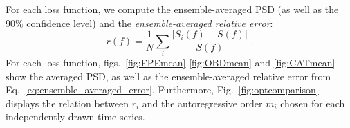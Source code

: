 \documentclass[twocolumn,showpacs,preprintnumbers,nofootinbib,prd,
superscriptaddress,10pt]{revtex4-1}
\begin{document}
For each loss function, we compute the ensemble-averaged PSD (as well as the $90\%$ confidence level) and the \textit{ensemble-averaged relative error}:
\begin{equation}\label{eq:ensemble_averaged_error}
	r(f) = \frac{1}{N} \sum_i \frac{|S_i(f) - S(f)|}{S(f)} \;.
\end{equation}
For each loss function, figs.~\ref{fig:FPEmean} \ref{fig:OBDmean} and \ref{fig:CATmean} show the averaged PSD, 
as well as the ensemble-averaged relative error from Eq.~\eqref{eq:ensemble_averaged_error}.
Furthermore, Fig.~\ref{fig:optcomparison} displays the relation between $r_i$ and the autoregressive 
order $m_i$ chosen for each independently drawn time series.

\end{document}
